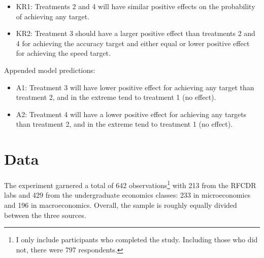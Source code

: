 \documentclass[
  12,
  letterpaper,
  DIV=11,
  numbers=noendperiod]{scrartcl}
\providecommand{\tightlist}{%
  \setlength{\itemsep}{0pt}\setlength{\parskip}{0pt}}\usepackage{longtable,booktabs,array}
\begin{document}
\begin{itemize}
\tightlist
\item
  KR1: Treatments 2 and 4 will have similar positive effects on the
  probability of achieving any target.
\item
  KR2: Treatment 3 should have a larger positive effect than treatments
  2 and 4 for achieving the accuracy target and either equal or lower
  positive effect for achieving the speed target.
\end{itemize}

\noindent Appended model predictions:

\begin{itemize}
\tightlist
\item
  A1: Treatment 3 will have lower positive effect for achieving any
  target than treatment 2, and in the extreme tend to treatment 1 (no
  effect).
\item
  A2: Treatment 4 will have a lower positive effect for achieving any
  targets than treatment 2, and in the extreme tend to treatment 1 (no
  effect).
\end{itemize}

\section{Data}\label{data}

The experiment garnered a total of 642 observations\footnote{I only
  include participants who completed the study. Including those who did
  not, there were 797 respondents.} with 213 from the RFCDR labs and 429
from the undergraduate economics classes: 233 in microeconomics and 196
in macroeconomics. Overall, the sample is roughly equally divided
between the three sources.
\end{document}
